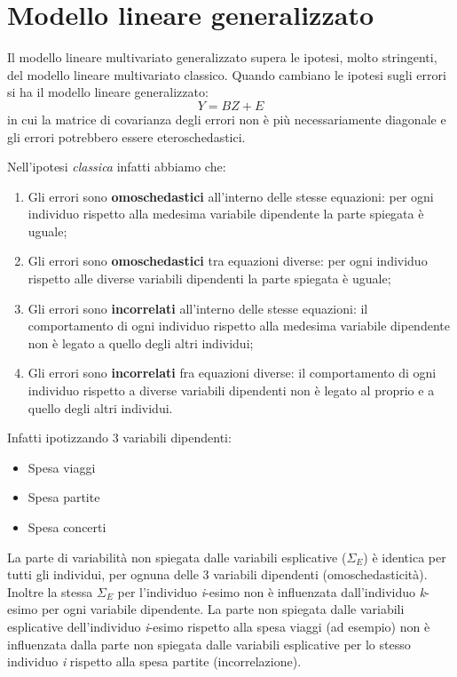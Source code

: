 \documentclass[a4page, 11pt]{article} %
\begin{document}
\section{Modello lineare generalizzato}
Il modello lineare multivariato generalizzato supera le ipotesi, molto stringenti, del modello lineare multivariato classico.
Quando cambiano le ipotesi sugli errori si ha il modello lineare generalizzato: $$Y = BZ+E$$ in cui la matrice di covarianza degli errori non è più necessariamente diagonale e gli errori potrebbero essere eteroschedastici. 

Nell’ipotesi \emph{classica} infatti abbiamo che:

\begin{enumerate}[noitemsep]
\item Gli errori sono \textbf{omoschedastici} all’interno delle stesse equazioni: per ogni individuo rispetto alla medesima variabile dipendente la parte spiegata è uguale;
\item Gli errori sono \textbf{omoschedastici} tra equazioni diverse: per ogni individuo rispetto alle diverse variabili dipendenti la parte spiegata è uguale;
\item Gli errori sono \textbf{incorrelati} all’interno delle stesse equazioni: il comportamento di ogni individuo rispetto alla medesima variabile dipendente non è legato a quello degli altri individui;
\item Gli errori sono \textbf{incorrelati} fra equazioni diverse: il comportamento di ogni individuo rispetto a diverse variabili dipendenti non è legato al proprio e a quello degli altri individui.
\end{enumerate}
Infatti ipotizzando 3 variabili dipendenti:
\begin{itemize}[noitemsep]
\item Spesa viaggi
\item Spesa partite
\item Spesa concerti
\end{itemize}
La parte di variabilità non spiegata dalle variabili esplicative ($\Sigma_{E}$) è identica per tutti gli individui, per ognuna delle 3  variabili dipendenti (omoschedasticità). Inoltre la stessa $\Sigma_E$ per l’individuo \textit{i}-esimo non è influenzata dall’individuo \textit{k}-esimo per ogni variabile dipendente. La parte non spiegata dalle variabili esplicative dell’individuo \textit{i}-esimo rispetto alla spesa viaggi (ad esempio) non è influenzata dalla parte non spiegata dalle variabili esplicative per lo stesso individuo \textit{i} rispetto alla spesa partite (incorrelazione).
\end{document}

